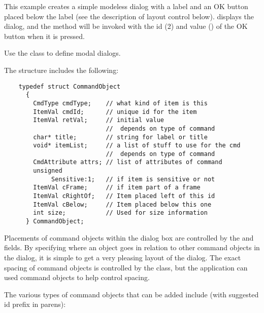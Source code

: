 This example creates a simple modeless dialog with a label and
an OK button placed below the label (see the description
of layout control below).  displays the dialog,
and the  method will be invoked with
the id (2) and value () of the OK button when it is
pressed.

Use the  class to define modal
dialogs.

\vspace{.1in}

The  structure includes the following:

\footnotesize
\begin{verbatim}
    typedef struct CommandObject
      {
        CmdType cmdType;    // what kind of item is this
        ItemVal cmdId;      // unique id for the item
        ItemVal retVal;     // initial value
                            //  depends on type of command
        char* title;        // string for label or title
        void* itemList;     // a list of stuff to use for the cmd
                            //  depends on type of command
        CmdAttribute attrs; // list of attributes of command
        unsigned
             Sensitive:1;   // if item is sensitive or not
        ItemVal cFrame;     // if item part of a frame
        ItemVal cRightOf;   // Item placed left of this id
        ItemVal cBelow;     // Item placed below this one
        int size;           // Used for size information
      } CommandObject;
\end{verbatim}
\normalfont\normalsize

Placements of command objects within the dialog box are controlled
by the  and  fields. By specifying
where an object goes in relation to other command objects in the
dialog, it is simple to get a very pleasing layout of the dialog.
The exact spacing of command objects is controlled by the 
class, but the application can used  command
objects to help control spacing.

The various types of command objects that can be added include
(with suggested id prefix in parens):

